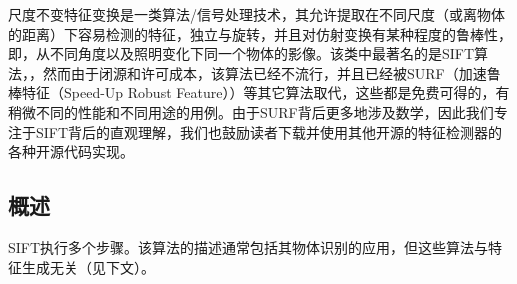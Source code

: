 尺度不变特征变换是一类算法/信号处理技术，其允许提取在不同尺度（或离物体的距离）下容易检测的特征，独立与旋转，并且对仿射变换有某种程度的鲁棒性，即，从不同角度以及照明变化下同一个物体的影像。该类中最著名的是SIFT算法\cite{lowe1999object}，，然而由于闭源和许可成本，该算法已经不流行，并且已经被SURF（加速鲁棒特征（Speed-Up Robust Feature））等其它算法取代，这些都是免费可得的，有稍微不同的性能和不同用途的用例。由于SURF背后更多地涉及数学，因此我们专注于SIFT背后的直观理解，我们也鼓励读者下载并使用其他开源的特征检测器的各种开源代码实现。



\subsection{概述}

SIFT执行多个步骤。该算法的描述通常包括其物体识别的应用，但这些算法与特征生成无关（见下文）。

